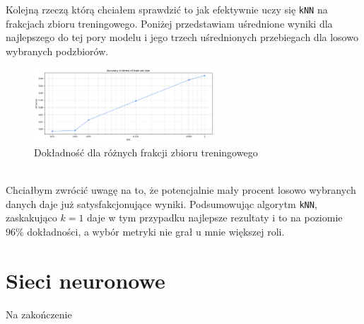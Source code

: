 \documentclass[polish,12pt,a4paper]{extarticle}
\begin{document}
Kolejną rzeczą którą chciałem sprawdzić to jak efektywnie uczy się \texttt{kNN} na frakcjach zbioru treningowego. Poniżej przedstawiam uśrednione wyniki dla najlepszego do tej pory modelu i jego trzech uśrednionych przebiegach dla losowo wybranych podzbiorów.
\begin{figure}[h!]
    \centering
    \includegraphics[width=0.60\textwidth]{img/accuracy_size.png}
    \caption{Dokładność dla różnych frakcji zbioru treningowego}
\end{figure} \FloatBarrier \\
Chciałbym zwrócić uwagę na to, że potencjalnie mały procent losowo wybranych danych daje już satysfakcjonujące wyniki. Podsumowując algorytm \texttt{kNN}, zaskakująco $k = 1$ daje w tym przypadku najlepsze rezultaty i to na poziomie $96\%$ dokładności, a wybór metryki nie grał u mnie większej roli.

\section*{Sieci neuronowe}
Na zakończenie
\end{document}
